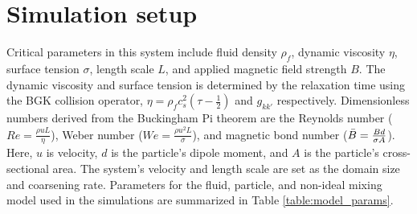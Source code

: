 \section{Simulation setup}
\label{section:sim_setup}

Critical parameters in this system include fluid density $\rho_f$, dynamic viscosity $\eta$, surface tension $\sigma$, 
length scale $L$, and applied magnetic field strength $B$. The dynamic viscosity and surface tension is determined 
by the relaxation time using the BGK collision operator, $\eta = \rho_f c_s^2(\tau - \frac{1}{2})$ and $g_{kk'}$ 
respectively. Dimensionless numbers derived from the Buckingham Pi theorem are the Reynolds number
($Re = \frac{\rho u L}{\eta}$), Weber number ($We = \frac{\rho u^2 L}{\sigma}$), and magnetic bond number 
($\Bar{B} = \frac{Bd}{\sigma A}$). Here, $u$ is velocity, $d$ is the particle's dipole moment, and $A$ is the 
particle's cross-sectional area. The system's velocity and length scale are set as the domain size and coarsening rate. 
Parameters for the fluid, particle, and non-ideal mixing model used in the simulations are summarized in Table 
\ref{table:model_params}.


